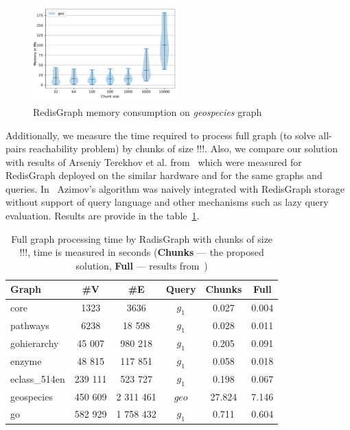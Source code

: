 \begin{figure}[h]
\centering
\includegraphics[width=0.5\textwidth]{data/raw_memory/geospecies.pdf}
\caption{RedisGraph memory consumption on \textit{geospecies} graph}
\label{fig:redis_memory_geospecies}
\end{figure}


Additionally, we measure the time required to process full graph (to solve all-pairs reachability problem) by chunks of size  !!!.
Also, we compare our solution with results of Arseniy Terekhov et al. from~\cite{10.1145/3398682.3399163} which were measured for RedisGraph deployed on the similar hardware and for the same graphs and queries. In~\cite{10.1145/3398682.3399163} Azimov's algorithm was naively integrated with RedisGraph storage without support of query language and other mechanisms such as lazy query evaluation.
Results are provide in the table~\ref{tbl:redis_full_graph_processing}.

\begin{table}
{
\caption{Full graph processing time by RadisGraph with chunks of size !!!, time is measured in seconds (\textbf{Chunks} --- the proposed solution, \textbf{Full} --- results from~\cite{10.1145/3398682.3399163})}
\label{tbl:redis_full_graph_processing}
\small
{}
\begin{tabular}{|l|c|c|c|c|c|}
\hline
Graph                       & \#V       & \#E      & Query  & Chunks  &  Full  \\
\hline
\hline
core                        & 1323     & 3636       & $g_1$  & 0.027  &  0.004 \\ 
pathways                    & 6238     & 18 598     & $g_1$  & 0.028  &  0.011 \\ 
gohierarchy                 & 45 007   & 980 218    & $g_1$  & 0.205  &  0.091 \\ 
enzyme                      & 48 815   & 117 851    & $g_1$  & 0.058  &  0.018 \\ 
eclass\_514en               & 239 111  & 523 727    & $g_1$  & 0.198  &  0.067 \\ 
geospecies                  & 450 609  & 2 311 461  & $geo$  & 27.824 &  7.146 \\
go                          & 582 929  & 1 758 432  & $g_1$  & 0.711  &  0.604 \\ 
\hline
\end{tabular}
}
\end{table}

